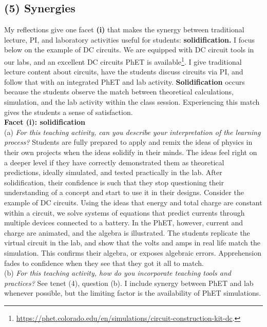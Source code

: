 \documentclass[../../../main.tex]{subfiles}
\begin{document}
\subsection{(5) Synergies}

My reflections give one facet \textbf{(i)} that makes the synergy between traditional lecture, PI, and laboratory activities useful for students: \textbf{solidification.}  I focus below on the example of DC circuits.  We are equipped with DC circuit tools in our labs, and an excellent DC circuits PhET is available\footnote{\url{https://phet.colorado.edu/en/simulations/circuit-construction-kit-dc}.}.  I give traditional lecture content about circuits, have the students discuss circuits via PI, and follow that with an integrated PhET and lab activity.  \textbf{Solidification} occurs because the students observe the match between theoretical calculations, simulation, and the lab activity within the class session.  Experiencing this match gives the students a sense of satisfaction.
\\
\vspace{0.15cm}
\textbf{Facet (i): solidification}
\\
\vspace{0.15cm}
(a) \textit{For this teaching activity, can you describe your interpretation of the learning process?}  Students are fully prepared to apply and remix the ideas of physics in their own projects when the ideas solidify in their minds.  The ideas feel right on a deeper level if they have correctly demonstrated them as theoretical predictions, ideally simulated, and tested practically in the lab.  After solidification, their confidence is such that they stop questioning their understanding of a concept and start to use it in their designs.  Consider the example of DC circuits.  Using the ideas that energy and total charge are constant within a circuit, we solve systems of equations that predict currents through multiple devices connected to a battery.  In the PhET, however, current and charge are animated, and the algebra is illustrated.  The students replicate the virtual circuit in the lab, and show that the volts and amps in real life match the simulation.  This confirms their algebra, or exposes algebraic errors.  Apprehension fades to confidence when they see that they got it all to match.
\\
\vspace{0.15cm}
(b) \textit{For this teaching activity, how do you incorporate teaching tools and practices?}  See tenet (4), question (b).  I include synergy between PhET and lab whenever possible, but the limiting factor is the availability of PhET simulations.
\end{document}
